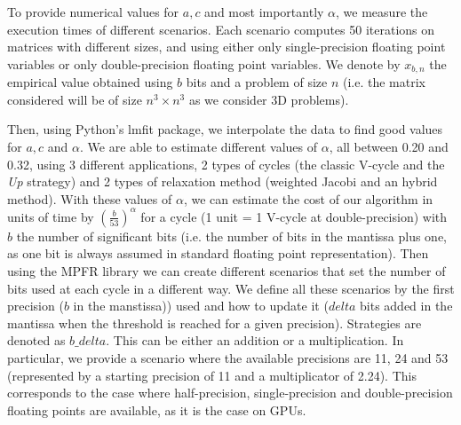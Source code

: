    To provide numerical values for $a,c$ and most importantly $\alpha$, we measure the execution times of different scenarios. Each scenario computes 50 iterations on matrices with different sizes, and using
   either only single-precision floating point variables or only double-precision floating point variables. We denote by $x_{b,n}$ the empirical value obtained using $b$ bits and a problem of size $n$ (i.e. the matrix
   considered will be of size $n^3 \times n^3$ as we consider 3D problems). %
   
   Then, using Python's lmfit package, we interpolate the data to find good values for $a,c$ and $\alpha$. We are able to estimate different values of $\alpha$, all between 0.20 and 0.32, using 3
   different applications, 2 types of cycles (the classic V-cycle and the \emph{Up} strategy) and 2 types of relaxation method (weighted Jacobi and an hybrid method).
   With these values of $\alpha$, we can estimate the cost of our algorithm in units of time by $\left(\frac{b}{53}\right)^\alpha$ for a cycle (1 unit = 1 V-cycle at double-precision) with $b$ the number of significant
   bits (i.e. the number of bits in the mantissa plus one, as one bit is always assumed in standard floating point representation). Then using the MPFR library we can create different
   scenarios that set the number of bits used at each cycle in a different way. We define all these scenarios by the first precision ($b$ in the manstissa)) used and how to update it ($delta$ bits added in the mantissa when the threshold is reached for a given precision).
   Strategies are denoted as $b\_delta$.
   This can be either an addition or a multiplication. In particular, we provide a scenario where the available precisions are 11, 24 and 53 (represented by a starting precision of 11 and a multiplicator of 2.24). This
   corresponds to the case where half-precision, single-precision and double-precision floating points are available, as it is the case on GPUs.
   
